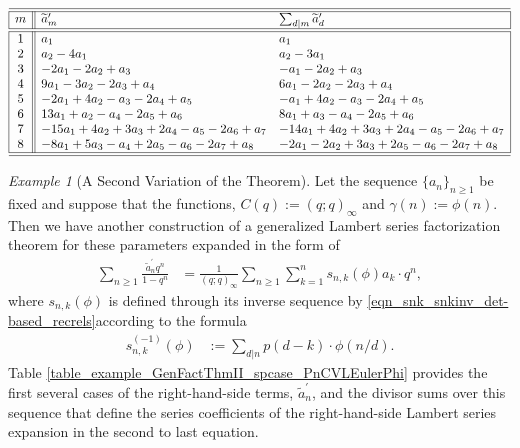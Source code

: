 \documentclass[10pt,reqno]{amsart}
\numberwithin{figure}{section}
\numberwithin{table}{section}
\theoremstyle{plain}
\numberwithin{theorem}{section}
\theoremstyle{remark}
\newtheorem{example}[theorem]{Example}
\begin{document}
\begin{table}[ht!] 
\centering

\small 
\begin{equation*} 
\begin{array}{|c||ll|} \hline\hline
m & \widetilde{a}_m^{\prime} & \sum_{d|m} \widetilde{a}_d^{\prime} \\ \hline\hline 
 1 & a_1 & a_1 \\
 2 & a_2-4 a_1 & a_2-3 a_1 \\
 3 & -2 a_1-2 a_2+a_3 & -a_1-2 a_2+a_3 \\
 4 & 9 a_1-3 a_2-2 a_3+a_4 & 6 a_1-2 a_2-2 a_3+a_4 \\
 5 & -2 a_1+4 a_2-a_3-2 a_4+a_5 & -a_1+4 a_2-a_3-2 a_4+a_5 \\
 6 & 13 a_1+a_2-a_4-2 a_5+a_6 & 8 a_1+a_3-a_4-2 a_5+a_6 \\
 7 & -15 a_1+4 a_2+3 a_3+2 a_4-a_5-2 a_6+a_7 & -14 a_1+4 a_2+3 a_3+2 a_4-a_5-2 a_6+a_7 \\
 8 & -8 a_1+5 a_3-a_4+2 a_5-a_6-2 a_7+a_8 & -2 a_1-2 a_2+3 a_3+2 a_5-a_6-2 a_7+a_8 \\
\hline\hline 
\end{array}
\end{equation*} 

\caption{Example of a second variant of the generalized factorization theorem where 
         $(C(q), \gamma(n)) := ((q; q)_{\infty}, \phi(n))$.} 
\label{table_example_GenFactThmII_spcase_PnCVLEulerPhi} 

\end{table} 

\begin{example}[A Second Variation of the Theorem] 
Let the sequence $\{a_n\}_{n \geq 1}$ be fixed and suppose that the functions, 
$C(q) := (q; q)_{\infty}$ and $\gamma(n) := \phi(n)$. 
Then we have another construction of a  generalized Lambert series factorization 
theorem for these parameters expanded in the form of 
\begin{align*} 
\sum_{n \geq 1} \frac{\widetilde{a}^{\prime}_n q^n}{1-q^n} & = \frac{1}{(q; q)_{\infty}} \sum_{n \geq 1} \sum_{k=1}^n 
     s_{n,k}(\phi) a_k \cdot q^n, 
\end{align*} 
where $s_{n,k}(\phi)$ is defined through its inverse sequence by 
\eqref{eqn_snk_snkinv_det-based_recrels}according to the formula 
\begin{align*} 
s_{n,k}^{(-1)}(\phi) & := \sum_{d|n} p(d-k) \cdot \phi(n/d). 
\end{align*} 
Table \ref{table_example_GenFactThmII_spcase_PnCVLEulerPhi} provides the first several cases of the 
right-hand-side terms, $\widetilde{a}^{\prime}_n$, and the divisor sums over this sequence that define the 
series coefficients of the right-hand-side Lambert series expansion in the second to last equation. 
\end{example} 
\end{document}
